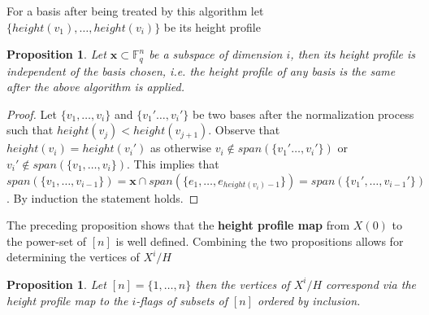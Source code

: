 \documentclass[11pt]{amsart}
\newtheorem{proposition}[theorem]{Proposition}
\begin{document}
    For a basis after being treated by this algorithm let $\{height(v_1),\dots,height(v_i)\}$ be its height profile
    \begin{proposition}
        Let $\textbf{x}\subset \mathbb{F}_q^n$ be a subspace of dimension $i$, then its height profile is independent of the basis chosen, i.e. the height profile of any basis is the same after the above algorithm is applied. 
        \label{prop:UniqueHeights}
    \end{proposition}
    \begin{proof}
        Let $\{v_1, \dots,v_i\}$ and $\{v_1'\dots, v_i'\}$ be two bases after the normalization process such that $height(v_j)<height(v_{j+1})$. Observe that $height(v_i)=height(v_i')$ as otherwise $v_i\notin span(\{v_1'\dots, v_i'\})$ or $v_i'\notin span(\{v_1, \dots,v_i\})$. This implies that $span(\{v_1,\dots, v_{i-1}\})=\mathbf{x}\cap span(\{e_1,\dots,e_{height(v_i)-1}\})=span(\{v_1',\dots, v_{i-1}'\})$. By induction the statement holds. 
    \end{proof}
    The preceding proposition shows that the \textbf{height profile map} from $X(0)$ to the power-set of $[n]$ is well defined.  Combining the two propositions allows for determining the vertices of $X^i/H$
    \begin{proposition}
        Let $[n]=\{1,\dots,n\}$ then the vertices of $X^i/H$ correspond via the height profile map to the $i$-flags of subsets of $[n]$ ordered by inclusion. 
        \label{prop:QuotientStructure}
    \end{proposition}
\end{document}
